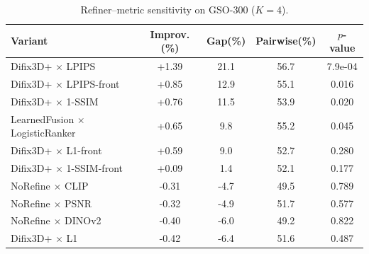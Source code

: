 \begin{table}[t]
  \centering
  \caption{Refiner--metric sensitivity on GSO-300 ($K{=}4$).}
  \label{tab:refiner_metric_sensitivity}
  \begin{tabular}{lcccc}
    \toprule
    Variant & Improv.(\%) & Gap(\%) & Pairwise(\%) & $p$-value \\
    \midrule
    Difix3D+ $\times$ LPIPS & +1.39 & 21.1 & 56.7 & 7.9e-04 \\
    Difix3D+ $\times$ LPIPS-front & +0.85 & 12.9 & 55.1 & 0.016 \\
    Difix3D+ $\times$ 1-SSIM & +0.76 & 11.5 & 53.9 & 0.020 \\
    LearnedFusion $\times$ LogisticRanker & +0.65 & 9.8 & 55.2 & 0.045 \\
    Difix3D+ $\times$ L1-front & +0.59 & 9.0 & 52.7 & 0.280 \\
    Difix3D+ $\times$ 1-SSIM-front & +0.09 & 1.4 & 52.1 & 0.177 \\
    NoRefine $\times$ CLIP & -0.31 & -4.7 & 49.5 & 0.789 \\
    NoRefine $\times$ PSNR & -0.32 & -4.9 & 51.7 & 0.577 \\
    NoRefine $\times$ DINOv2 & -0.40 & -6.0 & 49.2 & 0.822 \\
    Difix3D+ $\times$ L1 & -0.42 & -6.4 & 51.6 & 0.487 \\
    \bottomrule
  \end{tabular}
\end{table}
